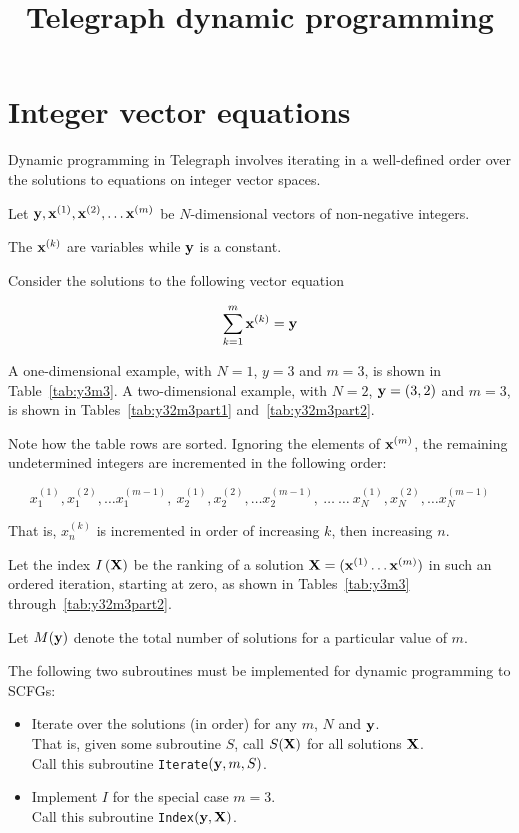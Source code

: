 \documentclass{article}
\begin{document}
\title{Telegraph dynamic programming}
\maketitle

\section{Integer vector equations}

Dynamic programming in Telegraph involves iterating
in a well-defined order over the
solutions to equations on integer vector spaces.

Let ${\bf y}, {\bf x}^{(1)}, {\bf x}^{(2)}, \ldots {\bf x}^{(m)}$
be $N$-dimensional vectors of non-negative integers.

The ${\bf x}^{(k)}$ are variables while ${\bf y}$ is a constant.

Consider the solutions to the following vector equation

\begin{equation}
\sum_{k=1}^m {\bf x}^{(k)} = {\bf y}
\label{eq:intsum}
\end{equation}

A one-dimensional example, with $N=1$, $y=3$ and $m=3$, is shown in
Table~\ref{tab:y3m3}.
A two-dimensional example, with $N=2$, ${\bf y}=(3,2)$ and $m=3$,
is shown in Tables~\ref{tab:y32m3part1} and~\ref{tab:y32m3part2}.

Note how the table rows are sorted.
Ignoring the elements of ${\bf x}^{(m)}$,
the remaining undetermined integers are incremented in the following order:

\[
x^{(1)}_1, x^{(2)}_1, \ldots x^{(m-1)}_1,
\ x^{(1)}_2, x^{(2)}_2, \ldots x^{(m-1)}_2,
\ \ldots\ \ldots
\ x^{(1)}_N, x^{(2)}_N, \ldots x^{(m-1)}_N
\]

That is, $x^{(k)}_n$ is incremented in order of increasing $k$,
then increasing $n$.

Let the index $I\left({\bf X}\right)$
be the ranking of a solution ${\bf X} = ({\bf x}^{(1)} \ldots {\bf x}^{(m)})$
in such an ordered iteration, starting at zero,
as shown in Tables~\ref{tab:y3m3} through~\ref{tab:y32m3part2}.

Let $M({\bf y})$ denote the total number of solutions for a particular value of $m$.

The following two subroutines must be implemented for
dynamic programming to SCFGs:

\begin{itemize}
\item Iterate over the solutions (in order) for any $m$, $N$ and ${\bf y}$. \\
That is, given some subroutine $S$, call $S({\bf X})$ for all solutions ${\bf X}$. \\
Call this subroutine {\tt Iterate}$({\bf y},m,S)$.
\item Implement $I$ for the special case $m=3$. \\
Call this subroutine {\tt Index}$({\bf y},{\bf X})$.
\end{itemize}
\end{document}
